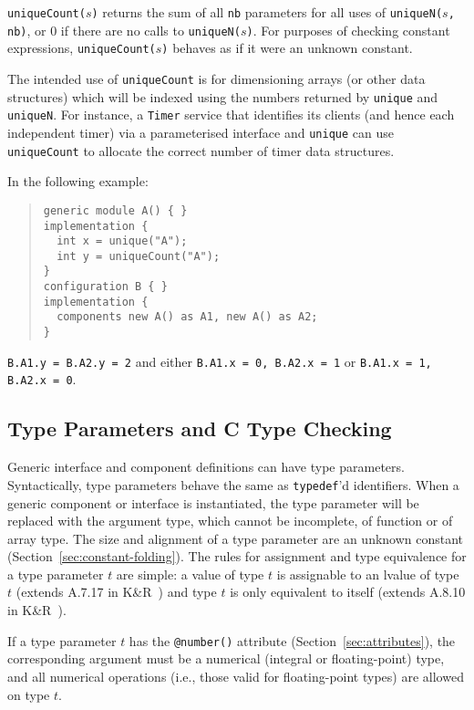 \documentclass[11pt,letterpaper]{article}
\newcommand{\kw}[1]{{\tt #1}}
\newcommand{\code}[1]{{\tt #1}}
\begin{document}
\begin{itemize}
\code{uniqueCount($s$)} returns the sum of all \code{nb} parameters
for all uses of \code{uniqueN($s$, nb)}, or 0 if there are no calls to
\code{uniqueN($s$)}. For purposes of checking constant expressions,
\code{uniqueCount($s$)} behaves as if it were an unknown constant.

The intended use of \code{uniqueCount} is for dimensioning arrays (or
other data structures) which will be indexed using the numbers
returned by \kw{unique} and \kw{uniqueN}. For instance, a \kw{Timer}
service that identifies its clients (and hence each independent timer)
via a parameterised interface and \kw{unique} can use \kw{uniqueCount}
to allocate the correct number of timer data structures.

\end{itemize}

In the following example:
\begin{quote}
\begin{verbatim}
generic module A() { }
implementation {
  int x = unique("A");
  int y = uniqueCount("A");
}
configuration B { }
implementation {
  components new A() as A1, new A() as A2;
}
\end{verbatim}
\end{quote}
\code{B.A1.y = B.A2.y = 2} and either \code{B.A1.x = 0, B.A2.x = 1} or
\code{B.A1.x = 1, B.A2.x = 0}.

\subsection{Type Parameters and C Type Checking}
\label{sec:type-parameters}

Generic interface and component definitions can have type
parameters. Syntactically, type parameters behave the same as \kw{typedef}'d
identifiers. When a generic component or interface is instantiated, the
type parameter will be replaced with the argument type, which cannot be
incomplete, of function or of array type. The size and alignment of a type
parameter are an unknown constant (Section~\ref{sec:constant-folding}).
The rules for assignment and type equivalence for a type parameter $t$ are
simple: a value of type $t$ is assignable to an lvalue of type $t$ (extends
A.7.17 in K\&R~\cite{kandr}) and type $t$ is only equivalent to itself (extends
A.8.10 in K\&R~\cite{kandr}).

If a type parameter $t$ has the \code{@number()} attribute
(Section~\ref{sec:attributes}), the corresponding argument must be a
numerical (integral or floating-point) type, and all numerical operations
(i.e., those valid for floating-point types) are allowed on type $t$.
\end{document}
